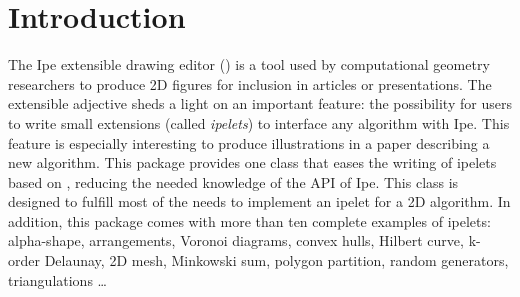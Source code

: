 \section{Introduction}

The Ipe extensible drawing editor () \cite{schwarzkopf1995ede,ipe:man-09}
is a tool used by computational geometry researchers to produce 2D figures for inclusion in articles or presentations.
The extensible adjective sheds a light on an important feature:
the possibility for users to write small extensions (called \textit{ipelets})
to interface any algorithm with Ipe. This feature is especially interesting 
to produce illustrations in a paper describing a new algorithm.
This package provides one class
that eases the writing of ipelets based on \cgal{}, reducing the needed knowledge of the API of Ipe.
This class is designed to fulfill most of the needs to implement an ipelet for a 2D \cgal{} algorithm.
In addition, this package comes with more than ten complete examples
of ipelets: alpha-shape, arrangements, Voronoi diagrams, convex hulls, Hilbert curve, k-order Delaunay,
2D mesh, Minkowski sum, polygon partition, random generators, triangulations \dots



